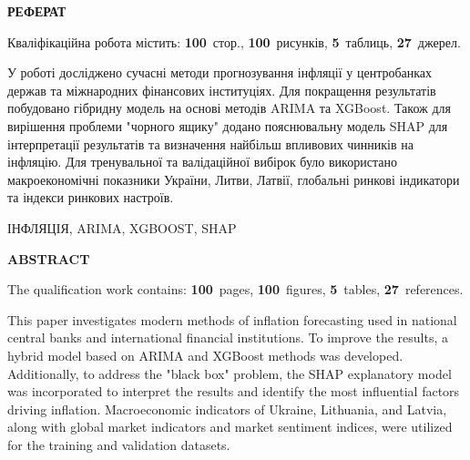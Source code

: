 \documentclass[a4paper,ukrainian,oneside]{extreport}
\newcommand{\setfontsize}[1]{\fontsize{#1pt}{#1pt}\selectfont}
\begin{document}
\newpage
\thispagestyle{plain}
\setfontsize{14}

\begin{center}
    {\bfseries\Large РЕФЕРАТ}
\end{center}

\vspace{12pt}

Кваліфікаційна робота містить: \textbf{100}~стор., \textbf{100}~рисунків, \textbf{5}~таблиць, \textbf{27}~джерел.

У роботі досліджено сучасні методи прогнозування інфляції у центробанках держав та міжнародних фінансових інституціях. Для покращення результатів побудовано гібридну модель на основі методів ARIMA та XGBoost. Також для вирішення проблеми "чорного ящику" додано пояснювальну модель SHAP для інтерпретації результатів та визначення найбільш впливових чинників на інфляцію. Для тренувальної та валідаційної вибірок було використано макроекономічні показники України, Литви, Латвії, глобальні ринкові індикатори та індекси ринкових настроїв.

\vspace{6pt}
\MakeUppercase{інфляція, arima, xgboost, shap}

\newpage
\thispagestyle{plain}
\setfontsize{14}

\begin{center}
    {\bfseries\Large ABSTRACT}
\end{center}

\vspace{12pt}

The qualification work contains: \textbf{100}~pages, \textbf{100}~figures, \textbf{5}~tables, \textbf{27}~references.

This paper investigates modern methods of inflation forecasting used in national central banks and international financial institutions. To improve the results, a hybrid model based on ARIMA and XGBoost methods was developed. Additionally, to address the "black box" problem, the SHAP explanatory model was incorporated to interpret the results and identify the most influential factors driving inflation. Macroeconomic indicators of Ukraine, Lithuania, and Latvia, along with global market indicators and market sentiment indices, were utilized for the training and validation datasets.
\end{document}
